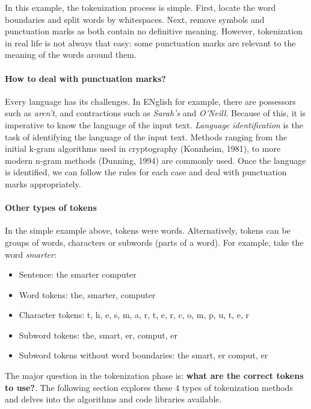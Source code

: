 In this example, the tokenization process is simple. First, locate the word boundaries and split words by whitespaces. Next, remove symbols and punctuation marks as both contain no definitive meaning. However, tokenization in real life is not always that easy: some punctuation marks are relevant to the meaning of the words around them.

\paragraph{How to deal with punctuation marks?}

Every language has its challenges. In ENglish for example, there are possessors such as \emph{aren't}, and contractions such as \emph{Sarah's} and \emph{O'Neill}. Because of this, it is imperative to know the language of the input text. \textit{Language identification} is the task of identifying the language of the input text. Methods ranging from the initial k-gram algorithms used in cryptography (Konnheim, 1981), to more modern n-gram methods (Dunning, 1994) are commonly used. Once the language is identified, we can follow the rules for each case and deal with punctuation marks appropriately.

\paragraph{Other types of tokens}

In the simple example above, tokens were words. Alternatively, tokens can be groups of words, characters or subwords (parts of a word). For example, take the word \emph{smarter}:

\begin{itemize}
    \item Sentence: the smarter computer
    \item Word tokens: the, smarter, computer
    \item Character tokens: t, h, e, s, m, a, r, t, e, r, c, o, m, p, u, t, e, r
    \item Subword tokens: the, smart, er, comput, er
    \item Subword tokens without word boundaries: the smart, er comput, er
\end{itemize}

The major question in the tokenization phase is: \textbf{what are the correct tokens to use?}. The following section explores these 4 types of tokenization methods and delves into the algorithms and code libraries available.

